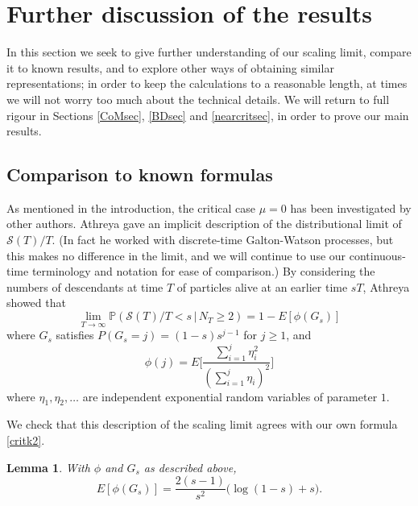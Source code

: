 \documentclass{article}
\theoremstyle{plain}
\newtheorem{lem}[thm]{Lemma}
\theoremstyle{definition}
\renewcommand{\P}{\mathbb{P}}
\renewcommand{\S}{\mathcal{S}}
\begin{document}
\section{Further discussion of the results}\label{chatsec}

In this section we seek to give further understanding of our scaling limit, compare it to known results, and to explore other ways of obtaining similar representations; in order to keep the calculations to a reasonable length, at times we will not worry too much about the technical details. We will return to full rigour in Sections \ref{CoMsec}, \ref{BDsec} and \ref{nearcritsec}, in order to prove our main results.

\subsection{Comparison to known formulas}\label{comparisonsec}

As mentioned in the introduction, the critical case $\mu=0$ has been investigated by other authors. Athreya \cite{athreya:coalescence} gave an implicit description of the distributional limit of $\S(T)/T$. (In fact he worked with discrete-time Galton-Watson processes, but this makes no difference in the limit, and we will continue to use our continuous-time terminology and notation for ease of comparison.) By considering the numbers of descendants at time $T$ of particles alive at an earlier time $sT$, Athreya showed that
\[\lim_{T\to\infty} \P(\S(T)/T < s \,|\, N_T\ge 2) = 1 - E[\phi(G_s)]\]
where $G_s$ satisfies $P(G_s = j) = (1-s)s^{j-1}$ for $j\ge 1$, and
\[\phi(j) = E\bigg[\frac{\sum_{i=1}^j \eta_i^2}{(\sum_{i=1}^j \eta_i)^2}\bigg]\]
where $\eta_1,\eta_2,\ldots$ are independent exponential random variables of parameter $1$.

We check that this description of the scaling limit agrees with our own formula \eqref{critk2}.

\begin{lem}
With $\phi$ and $G_s$ as described above,
\[E[\phi(G_s)] = \frac{2(s-1)}{s^2}\big(\log(1-s)+s\big).\]
\end{lem}
\end{document}
